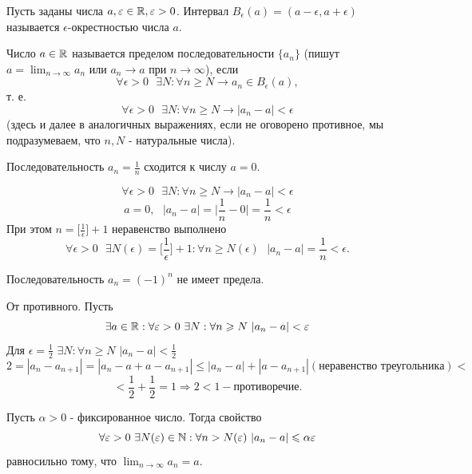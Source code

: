 	\begin{definition}
		Пусть заданы числа $a, \varepsilon \in \mathbb R, \varepsilon > 0$. Интервал  $B_{\epsilon}(a) = (a - \epsilon, a + \epsilon)$ называется $\epsilon$-окрестностью числа $a$.
	\end{definition}
	
	\begin{definition}
		Число $a \in \mathbb R$ называется пределом последовательности $\{a_n\}$ (пишут $a = \lim_{n \to \infty} a_n$ или $a_n \to a$ при $n \to \infty$), если
		\[ \forall \epsilon > 0 \text{ } \exists N : \forall n \geqslant N \rightarrow a_n \in B_{\epsilon}(a), \]
		т. е.
		\[ \forall \epsilon > 0 \text{ } \exists N : \forall n \geqslant N \rightarrow |a_n - a| < \epsilon \]
		(здесь и далее в аналогичных выражениях, если не оговорено противное, мы подразумеваем, что $n, N$ - натуральные числа).
	\end{definition}
	
	\begin{example}
		Последовательность $a_n = \frac{1}{n}$ сходится к числу $a = 0$.
	\end{example}
	\[ \forall \epsilon > 0 \text{ } \exists N : \forall n \geqslant N \rightarrow |a_n - a| < \epsilon \]
	\[ a = 0, \text{ } |a_n - a| = \bigg|\frac{1}{n} - 0\bigg| = \frac{1}{n} < \epsilon \]
	При этом $n = \big[\frac{1}{\epsilon}\big] + 1$ неравенство выполнено
	\[ \forall \epsilon > 0 \text{ } \exists N(\epsilon) = \bigg[\frac{1}{\epsilon}\bigg] + 1 : \forall n \geqslant N(\epsilon) \text{ } |a_n - a| = \frac{1}{n} < \epsilon. \]
	
	\begin{example}
		Последовательность $a_n = (-1)^n$ не имеет предела.
	\end{example}
	От противного. Пусть
	\[ \exists a \in \mathbb R : \forall \varepsilon > 0 \text{ } \exists N : \forall n \geqslant N \text{ } |a_n - a| < \varepsilon \]
	Для $\epsilon = \frac{1}{2}$ $\exists N: \forall n \geqslant N$ $|a_n - a| < \frac{1}{2}$
	\[ 2 = |a_n - a_{n + 1}| = |a_n - a + a - a_{n + 1}| \leqslant |a_n - a| + |a - a_{n + 1}| (\text{неравенство треугольника}) < \]
	\[ < \frac{1}{2} + \frac{1}{2} = 1 \Rightarrow 2 < 1 - \text{противоречие}. \]
	
	\begin{mention}
		Пусть $\alpha > 0$ - фиксированное число. Тогда свойство
		\[ \forall \varepsilon > 0 \text{ } \exists N(\varepsilon) \in \mathbb N : \forall n > N(\varepsilon) \text{ } |a_n - a| \leqslant \alpha \varepsilon \]
		равносильно тому, что $\lim_{n \to \infty} a_n = a.$
	\end{mention}
	

